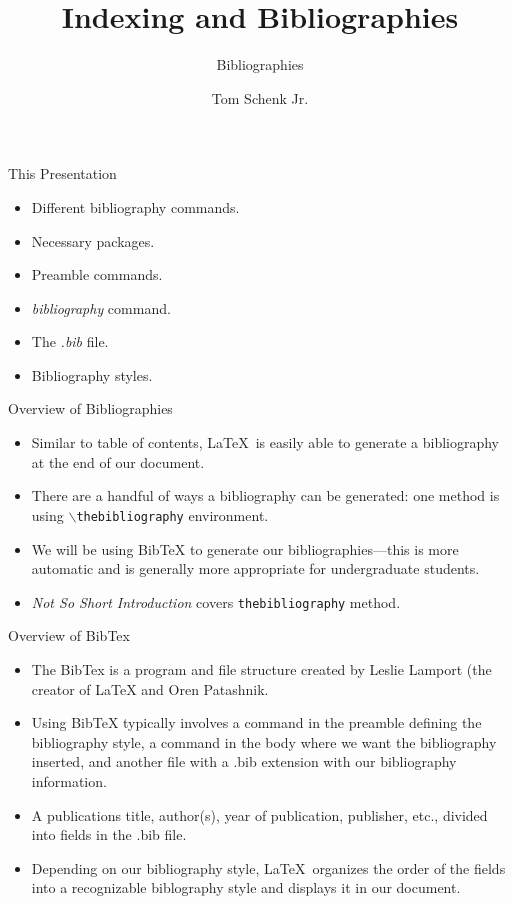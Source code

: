 \documentclass[pdf]{prosper}
\title{Indexing and Bibliographies}
\subtitle{Bibliographies}
\author{Tom Schenk Jr.}
\begin{document}
\maketitle
\begin{slide}{This Presentation}
	\begin{itemize}
		\item Different bibliography commands.
		\item Necessary packages.
		\item Preamble commands.
		\item \textit{bibliography} command.
		\item The \textit{.bib} file.
		\item Bibliography styles.
	\end{itemize}
\end{slide}
\begin{slide}{Overview of Bibliographies}
	\begin{itemize}
		\item Similar to table of contents, \LaTeX\ is easily able to generate a bibliography at the end of our document.
		\item There are a handful of ways a bibliography can be generated: one method is using \texttt{$\backslash$thebibliography} environment.
		\item We will be using BibTeX to generate our bibliographies---this is more automatic and is generally more appropriate for undergraduate students.
		\item \textit{Not So Short Introduction} covers \texttt{thebibliography} method.
	\end{itemize}
\end{slide}
\begin{slide}{Overview of BibTex}
	\begin{itemize}
		\item The BibTex is a program and file structure created by Leslie Lamport (the creator of \LaTeX\) and Oren Patashnik.
		\item Using BibTeX typically involves a command in the preamble defining the bibliography style, a command in the body where we want the bibliography inserted, and another file with a .bib extension with our bibliography information.
		\item A publications title, author(s), year of publication, publisher, etc., divided into fields in the .bib file.
		\item Depending on our bibliography style, \LaTeX\ organizes the order of the fields into a recognizable biblography style and displays it in our document.
	\end{itemize}
\end{slide}
\end{document}
